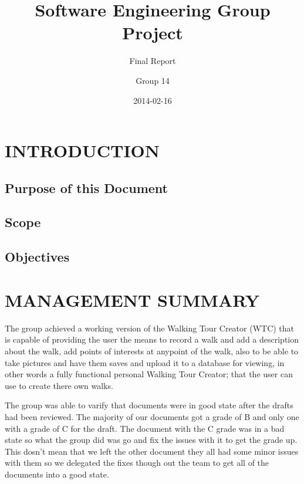 \documentclass{project}
\begin{document}
\title{Software Engineering Group Project}
\subtitle{Final Report}
\author{Group 14}     
\date{2014-02-16}

\maketitle

\tableofcontents

\newpage

\section{INTRODUCTION}
\subsection{Purpose of this Document}
\subsection{Scope}
\subsection{Objectives}

\newpage

\section{MANAGEMENT SUMMARY}

The group achieved a working version of the Walking Tour Creator (WTC) that is capable of providing the user the means to record a walk and add a description about the walk, add points of interests at anypoint of the walk, also to be able to take pictures and have them saves and upload it to a database for viewing, in other words a fully functional personal Walking Tour Creator; that the user can use to create there own walks.
	
The group was able to varify that documents were in good state after the drafts had been reviewed. The majority of our documents got a grade of B and only one with a grade of C for the draft. The document with the C grade was in a bad state so what the group did was go and fix the issues with it to get the grade up. This dosn't mean that we left the other document they all had some minor issues with them so we delegated the fixes though out the team to get all of the documents into a good state.
\end{document}
